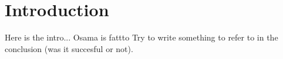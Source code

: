 \chapter{Introduction}\label{chap:Intro}

Here is the intro...
 Osama is fattto
Try to write something to refer to in the conclusion (was it succesful or not).
